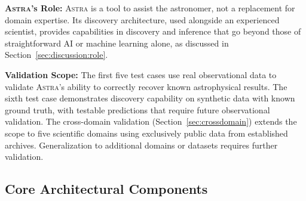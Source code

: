 \documentclass[usenatbib]{rasti}
\newcommand{\astra}{\textsc{Astra}\xspace}
\begin{document}
\textbf{\astra's Role:}
\astra is a tool to assist the astronomer, not a replacement for domain expertise.
Its discovery architecture, used alongside an experienced scientist, provides capabilities in discovery and inference that go beyond those of straightforward AI or machine learning alone, as discussed in Section~\ref{sec:discussion:role}.

\textbf{Validation Scope:}
The first five test cases use real observational data to validate \astra's ability to correctly recover known astrophysical results.
The sixth test case demonstrates discovery capability on synthetic data with known ground truth, with testable predictions that require future observational validation.
The cross-domain validation (Section~\ref{sec:crossdomain}) extends the scope to five scientific domains using exclusively public data from established archives.
Generalization to additional domains or datasets requires further validation.

\subsection{Core Architectural Components}
\label{sec:methods:components}
\end{document}
